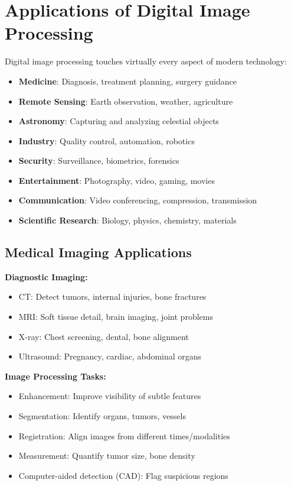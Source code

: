 \documentclass[12pt,a4paper]{article}
\begin{document}
\section{Applications of Digital Image Processing}

\begin{conceptbox}
Digital image processing touches virtually every aspect of modern technology:
\begin{itemize}
    \item \textbf{Medicine}: Diagnosis, treatment planning, surgery guidance
    \item \textbf{Remote Sensing}: Earth observation, weather, agriculture
    \item \textbf{Astronomy}: Capturing and analyzing celestial objects
    \item \textbf{Industry}: Quality control, automation, robotics
    \item \textbf{Security}: Surveillance, biometrics, forensics
    \item \textbf{Entertainment}: Photography, video, gaming, movies
    \item \textbf{Communication}: Video conferencing, compression, transmission
    \item \textbf{Scientific Research}: Biology, physics, chemistry, materials
\end{itemize}
\end{conceptbox}

\subsection{Medical Imaging Applications}

\begin{examplebox}
\textbf{Diagnostic Imaging:}
\begin{itemize}
    \item CT: Detect tumors, internal injuries, bone fractures
    \item MRI: Soft tissue detail, brain imaging, joint problems
    \item X-ray: Chest screening, dental, bone alignment
    \item Ultrasound: Pregnancy, cardiac, abdominal organs
\end{itemize}

\textbf{Image Processing Tasks:}
\begin{itemize}
    \item Enhancement: Improve visibility of subtle features
    \item Segmentation: Identify organs, tumors, vessels
    \item Registration: Align images from different times/modalities
    \item Measurement: Quantify tumor size, bone density
    \item Computer-aided detection (CAD): Flag suspicious regions
\end{itemize}
\end{examplebox}
\end{document}
